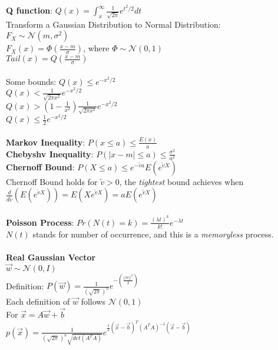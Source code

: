 \documentclass [12pt] {article}
\begin{document}
\begin{spacing}{1.5}
\begin{multicols}{2}
\noindent
\textbf{Q function}: $ Q(x) = \int_x^\infty \frac{1}{\sqrt{2\pi}}e^{t^2/2}dt$\\
Transform a Gaussian Distribution to Normal Distribution:\\
$F_X \sim \mathcal{N}(m,\sigma^2)$\\
$F_X(x) = \Phi (\frac{x-m}{\sigma})$, where $\Phi \sim \mathcal{N}(0,1)$\\
$Tail(x) = Q(\frac{x-m}{\sigma})$\\
~\\
Some bounds: $Q(x) \leq e^{-x^2/2}$\\
$Q(x) < \frac{1}{\sqrt{2\pi x^2}} e^{-x^2/2}$\\
$Q(x) > (1-\frac{1}{x^2})\frac{1}{\sqrt{2\pi x^2}} e^{-x^2/2}$\\
$Q(x)\leq\frac{1}{2}e^{-x^2/2}$\\
~\\
\textbf{Markov Inequality}: $P(x\leq a)\leq \frac{E(x)}{a}$\\
\textbf{Chebyshv Inequality}: $P(|x-m|\leq a) \leq \frac{\sigma^2}{a^2}$\\
\textbf{Chernoff Bound}: $P(X\leq a) \leq e^{-\widetilde{v}a}E(e^{\widetilde{v}X})$\\
Chernoff Bound holds for $\widetilde{v} > 0$, the \emph{tightest} bound achieves when\\
$\frac{d}{d\widetilde{v}}(E(e^{\widetilde{v}X})) = E(Xe^{\widetilde{v}X}) = a E(e^{\widetilde{v}X})$\\
~\\
\textbf{Poisson Process}: $Pr(N(t) = k) = \frac{(\lambda t)^k}{k !} e^{-\lambda t}$\\
$N(t)$ stands for number of occurrence, and this is a \emph{memoryless} process. \\
~\\
\textbf{Real Gaussian Vector} \\ $\vec{w} \sim \mathcal{N}(0, I)$\\
Definition: $P(\vec{w}) = \frac{1}{(\sqrt{2\pi})^n} e^{-(\frac{||w||^2}{2})}$\\
Each definition of $\vec{w}$ follows $\mathcal{N}(0,1)$\\
For $\vec{x} = A\vec{w} + \vec{b}$ \\
$p(\vec{x}) = \frac{1}{(\sqrt{2\pi})^n\sqrt{det(A^T A)}}e^{\frac{1}{2}(\vec{x}-\vec{b})^{T}(A^T A)^{-1}(\vec{x}-\vec{b})}$\\

\end{multicols}
\end{spacing}
\end{document}
